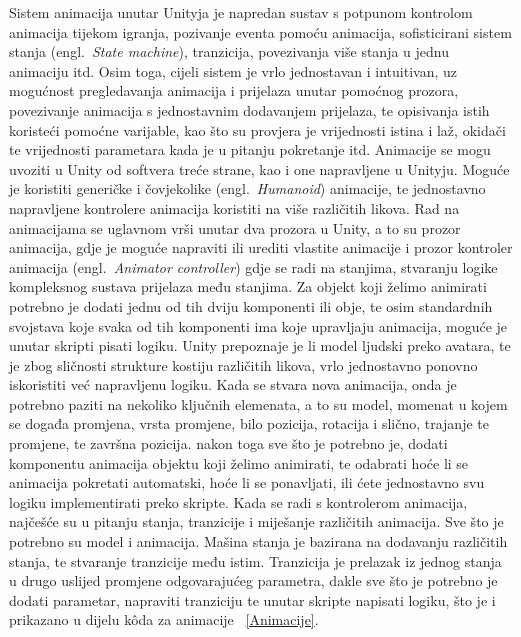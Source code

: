 Sistem animacija unutar Unityja je napredan sustav s potpunom kontrolom animacija tijekom igranja, pozivanje eventa pomoću animacija, sofisticirani sistem stanja (engl.~\textit{State machine}), tranzicija, povezivanja više stanja u jednu animaciju itd. Osim toga, cijeli sistem je vrlo jednostavan i intuitivan, uz mogućnost pregledavanja animacija i prijelaza unutar pomoćnog prozora, povezivanje animacija s jednostavnim dodavanjem prijelaza, te opisivanja istih koristeći pomoćne varijable, kao što su provjera je vrijednosti istina i laž, okidači te vrijednosti parametara kada je u pitanju pokretanje itd. Animacije se mogu uvoziti u Unity od softvera treće strane, kao i one napravljene u Unityju. Moguće je koristiti generičke i čovjekolike (engl.~\textit{Humanoid}) animacije, te jednostavno napravljene kontrolere animacija koristiti na više različitih likova. 
Rad na animacijama se uglavnom vrši unutar dva prozora u Unity, a to su prozor animacija, gdje je moguće napraviti ili urediti vlastite animacije i prozor kontroler animacija (engl.~\textit{Animator controller}) gdje se radi na stanjima, stvaranju logike kompleksnog sustava prijelaza među stanjima.
Za objekt koji želimo animirati potrebno je dodati jednu od tih dviju komponenti ili obje, te osim standardnih svojstava koje svaka od tih komponenti ima koje upravljaju animacija, moguće je unutar skripti pisati logiku. Unity prepoznaje je li model ljudski preko avatara, te je zbog sličnosti strukture kostiju različitih likova, vrlo jednostavno ponovno iskoristiti već napravljenu logiku. 
Kada se stvara nova animacija, onda je potrebno paziti na nekoliko ključnih elemenata, a to su model, momenat u kojem se događa promjena, vrsta promjene, bilo pozicija, rotacija i slično, trajanje te promjene, te završna pozicija. nakon toga sve što je potrebno je, dodati komponentu animacija objektu koji želimo animirati, te odabrati hoće li se animacija pokretati automatski, hoće li se ponavljati, ili ćete jednostavno svu logiku implementirati preko skripte.
Kada se radi s kontrolerom animacija, najčešće su u pitanju stanja, tranzicije i miješanje različitih animacija. Sve što je potrebno su model i animacija.
Mašina stanja je bazirana na dodavanju različitih stanja, te stvaranje tranzicije među istim. Tranzicija je prelazak iz jednog stanja u drugo uslijed promjene odgovarajućeg parametra, dakle sve što je potrebno je dodati parametar, napraviti tranziciju te unutar skripte napisati logiku, što je i prikazano u dijelu k\^oda za animacije ~\ref{Animacije}.

